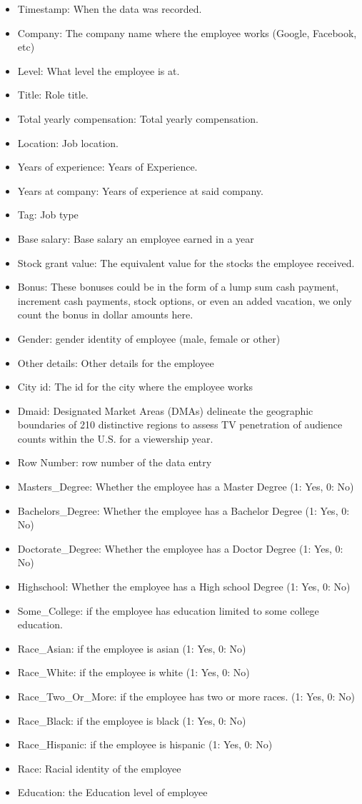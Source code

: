 \documentclass[
]{article}
\providecommand{\tightlist}{%
  \setlength{\itemsep}{0pt}\setlength{\parskip}{0pt}}
\begin{document}
\begin{itemize}
\tightlist
\item
  Timestamp: When the data was recorded.
\item
  Company: The company name where the employee works (Google, Facebook,
  etc)
\item
  Level: What level the employee is at.
\item
  Title: Role title.
\item
  Total yearly compensation: Total yearly compensation.
\item
  Location: Job location.
\item
  Years of experience: Years of Experience.
\item
  Years at company: Years of experience at said company.
\item
  Tag: Job type
\item
  Base salary: Base salary an employee earned in a year
\item
  Stock grant value: The equivalent value for the stocks the employee
  received.
\item
  Bonus: These bonuses could be in the form of a lump sum cash payment,
  increment cash payments, stock options, or even an added vacation, we
  only count the bonus in dollar amounts here.
\item
  Gender: gender identity of employee (male, female or other)
\item
  Other details: Other details for the employee
\item
  City id: The id for the city where the employee works
\item
  Dmaid: Designated Market Areas (DMAs) delineate the geographic
  boundaries of 210 distinctive regions to assess TV penetration of
  audience counts within the U.S. for a viewership year.
\item
  Row Number: row number of the data entry
\item
  Masters\_Degree: Whether the employee has a Master Degree (1: Yes, 0:
  No)
\item
  Bachelors\_Degree: Whether the employee has a Bachelor Degree (1: Yes,
  0: No)
\item
  Doctorate\_Degree: Whether the employee has a Doctor Degree (1: Yes,
  0: No)
\item
  Highschool: Whether the employee has a High school Degree (1: Yes, 0:
  No)
\item
  Some\_College: if the employee has education limited to some college
  education.
\item
  Race\_Asian: if the employee is asian (1: Yes, 0: No)
\item
  Race\_White: if the employee is white (1: Yes, 0: No)
\item
  Race\_Two\_Or\_More: if the employee has two or more races. (1: Yes,
  0: No)
\item
  Race\_Black: if the employee is black (1: Yes, 0: No)
\item
  Race\_Hispanic: if the employee is hispanic (1: Yes, 0: No)
\item
  Race: Racial identity of the employee
\item
  Education: the Education level of employee
\end{itemize}
\end{document}
